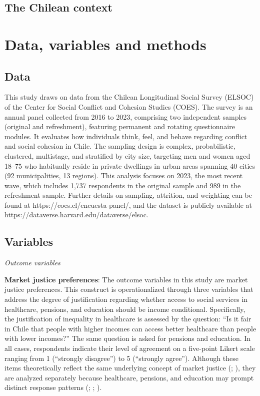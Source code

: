 \documentclass[
  13pt,
]{article}
\begin{document}
\subsection{The Chilean context}\label{the-chilean-context}

\section{Data, variables and methods}\label{data-variables-and-methods}

\subsection{Data}\label{data}

This study draws on data from the Chilean Longitudinal Social Survey
(ELSOC) of the Center for Social Conflict and Cohesion Studies (COES).
The survey is an annual panel collected from 2016 to 2023, comprising
two independent samples (original and refreshment), featuring permanent
and rotating questionnaire modules. It evaluates how individuals think,
feel, and behave regarding conflict and social cohesion in Chile. The
sampling design is complex, probabilistic, clustered, multistage, and
stratified by city size, targeting men and women aged 18--75 who
habitually reside in private dwellings in urban areas spanning 40 cities
(92 municipalities, 13 regions). This analysis focuses on 2023, the most
recent wave, which includes 1,737 respondents in the original sample and
989 in the refreshment sample. Further details on sampling, attrition,
and weighting can be found at https://coes.cl/encuesta-panel/, and the
dataset is publicly available at
https://dataverse.harvard.edu/dataverse/elsoc.

\subsection{Variables}\label{variables}

\emph{Outcome variables}

\textbf{Market justice preferences}: The outcome variables in this study
are market justice preferences. This construct is operationalized
through three variables that address the degree of justification
regarding whether access to social services in healthcare, pensions, and
education should be income conditional. Specifically, the justification
of inequality in healthcare is assessed by the question: ``Is it fair in
Chile that people with higher incomes can access better healthcare than
people with lower incomes?'' The same question is asked for pensions and
education. In all cases, respondents indicate their level of agreement
on a five-point Likert scale ranging from 1 (``strongly disagree'') to 5
(``strongly agree''). Although these items theoretically reflect the
same underlying concept of market justice
(;
), they are analyzed
separately because healthcare, pensions, and education may prompt
distinct response patterns
(;
;
).
\end{document}
